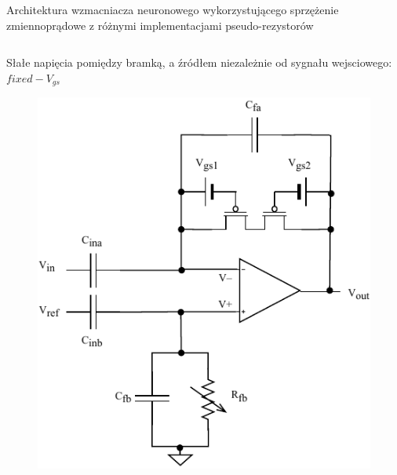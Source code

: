 \begin{frame}{Architektura wzmacniacza neuronowego wykorzystującego sprzężenie zmiennoprądowe z różnymi implementacjami pseudo-rezystorów}
\begin{columns}[t]
        \begin{exampleblock}{Słałe napięcia pomiędzy bramką, a źródłem niezależnie od sygnału wejsciowego: $fixed-V_{gs}$}
            \begin{figure}[H]
                \centering
                \includegraphics[scale = 0.55]{Figures/project.pdf}
            \end{figure}
        \end{exampleblock}

    \end{columns}
\end{frame}

